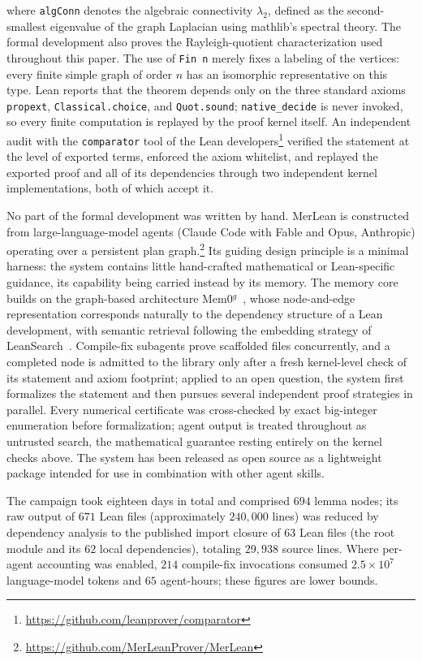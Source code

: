 \documentclass[11pt]{article}
\numberwithin{equation}{section}
\theoremstyle{definition}
\theoremstyle{remark}
\newcommand{\ac}{\lambda_2}
\begin{document}
\noindent where \texttt{algConn} denotes the algebraic connectivity
\(\ac\), defined as the second-smallest eigenvalue of the graph
Laplacian using mathlib's spectral theory.  The formal development also
proves the Rayleigh-quotient characterization used throughout this paper.
The use of \texttt{Fin n} merely fixes a labeling of the vertices: every
finite simple graph of order \(n\) has an isomorphic representative on this
type.
Lean reports that the theorem depends only on the three standard axioms
\texttt{propext}, \texttt{Classical.choice}, and \texttt{Quot.sound};
\texttt{native\_decide} is never invoked, so every finite computation
is replayed by the proof kernel itself.  An independent audit with the
\texttt{comparator} tool of the Lean
developers\footnote{\url{https://github.com/leanprover/comparator}}
verified the statement at the level of exported terms, enforced the
axiom whitelist, and replayed the exported proof and all of its dependencies
through two independent kernel implementations, both of which accept it.

No part of the formal development was written by hand.
MerLean is constructed from large-language-model agents
(Claude Code with Fable and Opus, Anthropic) operating
over a persistent plan graph.\footnote{\url{https://github.com/MerLeanProver/MerLean}}
Its guiding design principle is a minimal harness: the system contains
little hand-crafted mathematical or Lean-specific guidance, its
capability being carried instead by its memory.  The memory core
builds on the graph-based architecture
Mem0\(^{g}\)~\cite{chhikara2025mem0buildingproductionreadyai}, whose node-and-edge representation
corresponds naturally to the dependency structure of a Lean
development, with semantic retrieval following the embedding strategy
of LeanSearch~\cite{gao2025semanticsearchenginemathlib4}.  Compile-fix subagents prove scaffolded
files concurrently, and a completed node is admitted to the library
only after a fresh kernel-level check of its statement and axiom
footprint; applied to an open question, the system first formalizes the
statement and then pursues several independent proof strategies in
parallel.  Every numerical certificate was cross-checked by exact
big-integer enumeration before formalization; agent output is treated
throughout as untrusted search, the mathematical guarantee resting
entirely on the kernel checks above.  The system has been released as
open source as a lightweight package intended for use in combination
with other agent skills.

The campaign took eighteen days in total and comprised \(694\) lemma
nodes; its raw output of \(671\) Lean files (approximately
\(240{,}000\) lines) was reduced by dependency analysis to the
published import closure of \(63\) Lean files (the root module and its
\(62\) local dependencies), totaling \(29{,}938\) source lines.  Where per-agent
accounting was enabled, \(214\) compile-fix invocations consumed
\(2.5\times10^{7}\) language-model tokens and \(65\) agent-hours; these
figures are lower bounds.
\end{document}

